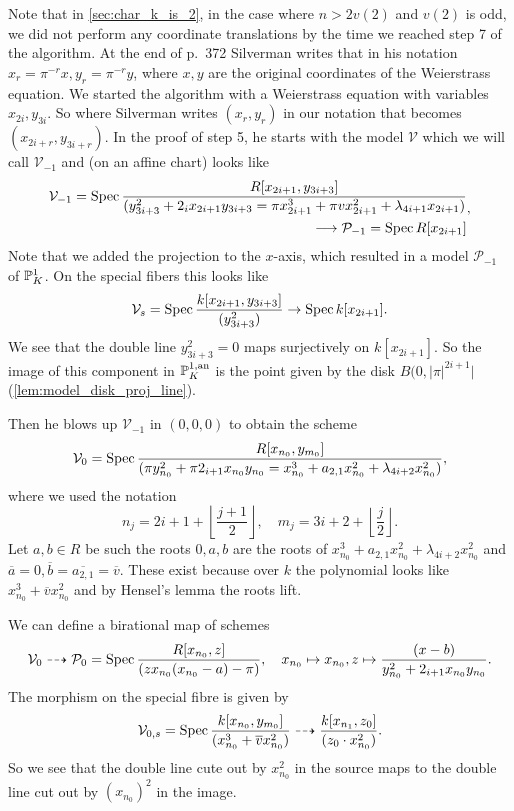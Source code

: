 Note that in \cref{sec:char_k_is_2}, in the case where $n > 2v(2)$ and $v(2)$ is odd, we did not perform any coordinate translations by the time we reached step 7 of the algorithm. 
At the end of p.\ 372 Silverman writes that in his notation $x_{r} = \pi^{-r}x, y_{r} = \pi^{-r}y$, where $x, y$ are the original coordinates of the Weierstrass equation. 
We started the algorithm with a Weierstrass equation with variables $x_{2i}, y_{3i}$. 
So where Silverman writes $(x_r, y_r)$ in our notation that becomes $(x_{2i+ r}, y_{3i + r})$. 
In the proof of step 5, he starts with the model $\mathcal{V} $ which we will call $\mathcal{V} _{-1}$ and (on an affine chart) looks like 
\[
	\begin{aligned}	
	\mathcal{V}_{-1} = \operatorname{Spec} \frac{R[x_{2i + 1}, y_{3i + 3}]}{(y_{3i + 3}^2 + 2_i x_{2i + 1}y_{3i + 3} = \pi x_{2i + 1}^3 + \pi v x_{2i + 1}^2 + \lambda_{4i + 1} x_{2i + 1})} \\ 
	\longrightarrow \mathcal{P} _{-1} = \operatorname{Spec} R[x_{2i + 1}]
	\end{aligned}
,\] 
Note that we added the projection to the $x$-axis, which resulted in a model $\mathscr P_{-1}$ of $\mathbb{P}^{1}_K$.  
On the special fibers this looks like 
\[
	\mathcal{V}_s = \operatorname{Spec} \frac{k[x_{2i + 1}, y_{3i + 3}]}{(y_{3i+3}^2)} \to \operatorname{Spec} k[x_{2i + 1}]
.\] 
We see that the double line $y_{3i + 3}^2 = 0$ maps surjectively on $k[x _{2i + 1}]$. 
So the image of this component in $\mathbb{P}^{1, \text{an}}_K$ is the point given by the disk $B(0, |\pi|^{2i + 1}|$ (\cref{lem:model_disk_proj_line}).


Then he blows up $\mathcal{V}_{-1} $ in $(0, 0, 0)$ to obtain the scheme
\[
	\mathcal{V}_0  = \operatorname{Spec} \frac{R[x_{n_0}, y_{m_0}]}{(\pi y_{n_0} ^2 + \pi2_{i + 1} x_{n_0} y_{n_0} = x_{n_0}^3 +  a_{2,1} x_{n_0}^2 + \lambda_{4i + 2} x_{n_0}^2)} 
,\] 
where we used the notation \[
	n_j = 2i + 1 + \left\lfloor \frac{j + 1}{2} \right\rfloor,\quad  m_j = 3i + 2 + \left\lfloor \frac{j }{2} \right\rfloor
.\]
Let $a, b \in R$ be such the roots $0, a, b$ are the roots of $x_{n_0}^3 +  a_{2,1} x_{n_0}^2 + \lambda_{4i + 2} x_{n_0}^2$ and $\overline{a} = 0, \overline{b} = \overline{a_{2,1}} = \overline{v}$.  
These exist because over $k$ the polynomial looks like $x_{n_0}^3 + \overline{v} x_{n_0}^2$ and by Hensel's lemma the roots lift. 

We can define a birational map of schemes \[
	\mathcal{V}_0 \dashrightarrow \mathcal{P} _{0} = \operatorname{Spec} \frac{R[x_{n_0}, z]}{(z x_{n_0}(x_{n_0} - a) - \pi)},\quad
	x_{n_0} \mapsto x_{n_0}, z\mapsto \frac{(x - b)}{y_{n_0}^2 + 2_{i + 1} x_{n_0}y_{n_0} }
.\] 
The morphism on the special fibre is given by \[
	\mathcal{V} _{0, s} = \operatorname{Spec} \frac{k[x_{n_0}, y_{m_0}]}{(x^3_{n_0} + \overline{v} x^2_{n_0})} \dashrightarrow \frac{k[x_{n_1}, z_0]}{(z_0 \cdot x_{n_0}^2)}
.\] 
So we see that the double line cute out by $x_{n_0}^2$ in the source maps to the double line cut out by $(x_{n_0})^2$ in the image. 

